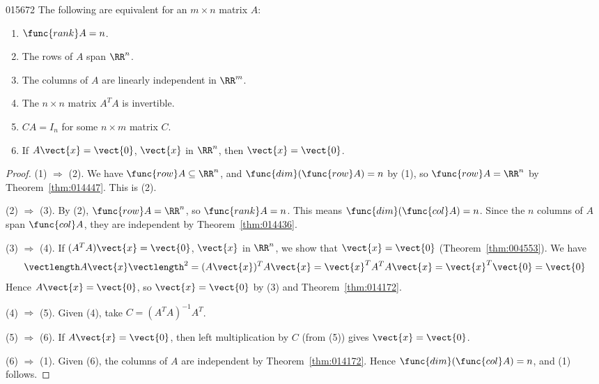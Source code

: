 \begin{theorem}{}{015672} %
The following are equivalent for an $m \times n$ matrix $A$:

\begin{enumerate}
\item $\func{rank} A = n$.

\item The rows of $A$ span $\RR^n$.

\item The columns of $A$ are linearly independent in $\RR^m$.

\item The $n \times n$ matrix $A^{T}A$ is invertible.

\item $CA = I_{n}$ for some $n \times m$ matrix $C$.

\item If $A\vect{x} = \vect{0}$, $\vect{x}$ in $\RR^n$, then $\vect{x} = \vect{0}$.

\end{enumerate}
\end{theorem}

\begin{proof}
(1) $\Rightarrow$ (2). We have $\func{row} A \subseteq \RR^n$, and $\func{dim}(\func{row} A) = n$ by (1), so $\func{row} A = \RR^n$ by Theorem~\ref{thm:014447}. This is (2).

(2) $\Rightarrow$ (3). By (2), $\func{row} A = \RR^n$, so $\func{rank} A = n$. This means $\func{dim}(\func{col} A) = n$. Since the $n$ columns of $A$ span $\func{col} A$, they are independent by Theorem~\ref{thm:014436}.

(3) $\Rightarrow$ (4). If $(A^{T}A)\vect{x} = \vect{0}$, $\vect{x}$ in $\RR^n$, we show that $\vect{x} = \vect{0}$ (Theorem~\ref{thm:004553}). We have
\begin{equation*}
\vectlength A\vect{x}\vectlength^2 = (A\vect{x})^TA\vect{x} = \vect{x}^TA^TA\vect{x} = \vect{x}^T\vect{0} = \vect{0}
\end{equation*}
Hence $A\vect{x} = \vect{0}$, so $\vect{x} = \vect{0}$ by (3) and Theorem~\ref{thm:014172}.

(4) $\Rightarrow$ (5). Given (4), take $C = (A^{T}A)^{-1}A^{T}$.

(5) $\Rightarrow$ (6). If $A\vect{x} = \vect{0}$, then left multiplication by $C$ (from (5)) gives $\vect{x} = \vect{0}$.

(6) $\Rightarrow$ (1). Given (6), the columns of $A$ are independent by Theorem~\ref{thm:014172}. Hence $\func{dim}(\func{col} A) = n$, and (1) follows.
\end{proof}

